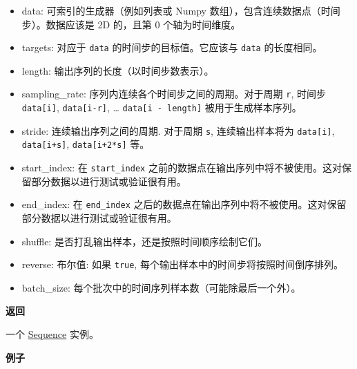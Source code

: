 \begin{itemize}
\tightlist
\item
  data: 可索引的生成器（例如列表或 Numpy
  数组），包含连续数据点（时间步）。数据应该是 2D 的，且第 0
  个轴为时间维度。
\item
  targets: 对应于 \texttt{data} 的时间步的目标值。它应该与 \texttt{data}
  的长度相同。
\item
  length: 输出序列的长度（以时间步数表示）。
\item
  sampling\_rate: 序列内连续各个时间步之间的周期。对于周期 \texttt{r},
  时间步 \texttt{data{[}i{]}}, \texttt{data{[}i-r{]}}, \ldots{}
  \texttt{data{[}i\ -\ length{]}} 被用于生成样本序列。
\item
  stride: 连续输出序列之间的周期. 对于周期 \texttt{s}, 连续输出样本将为
  \texttt{data{[}i{]}}, \texttt{data{[}i+s{]}}, \texttt{data{[}i+2*s{]}}
  等。
\item
  start\_index: 在 \texttt{start\_index}
  之前的数据点在输出序列中将不被使用。这对保留部分数据以进行测试或验证很有用。
\item
  end\_index: 在 \texttt{end\_index}
  之后的数据点在输出序列中将不被使用。这对保留部分数据以进行测试或验证很有用。
\item
  shuffle: 是否打乱输出样本，还是按照时间顺序绘制它们。
\item
  reverse: 布尔值: 如果 \texttt{true},
  每个输出样本中的时间步将按照时间倒序排列。
\item
  batch\_size: 每个批次中的时间序列样本数（可能除最后一个外）。
\end{itemize}

\textbf{返回}

一个 \href{https://keras.io/zh/utils/\#sequence}{Sequence} 实例。

\textbf{例子}

